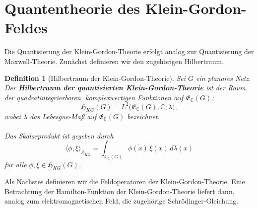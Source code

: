 \documentclass[11pt,a4paper,leqno]{report}
\newtheorem{definition}[theorem]{Definition}
\numberwithin{equation}{chapter}
\begin{document}
\section{Quantentheorie des Klein-Gordon-Feldes}
Die Quantisierung der Klein-Gordon-Theorie erfolgt analog zur Quantisierung
der Maxwell-Theorie. Zunächst definieren wir den zugehörigen Hilbertraum.

\begin{definition}[Hilbertraum der Klein-Gordon-Theorie]
	\label{def:KG-Hilbertraum}
	Sei $G$ ein planares Netz. Der \textbf{Hilbertraum der quantisierten
		Klein-Gordon-Theorie} ist der Raum der quadratintegrierbaren, komplexwertigen
	Funktionen auf $\mathfrak{E}_{\mathbb C}(G)$:
	\[
	\mathfrak H_{KG}(G)
	=
	L^2\bigl(\mathfrak E_{\mathbb C}(G),\mathbb C;\lambda\bigr),
	\]
	wobei $\lambda$ das Lebesgue-Maß auf $\mathfrak E_{\mathbb C}(G)$ bezeichnet.
	\\
	\\
	Das Skalarprodukt ist gegeben durch
	\begin{equation}
		\label{eq:KG-Hilbertraum-Skalarprodukt}
		\langle \phi,\xi\rangle_{\mathfrak H_{KG}}
		=
		\int_{\mathfrak E_{\mathbb C}(G)}
		\overline{\phi(x)}\,\xi(x)\,d\lambda(x)
	\end{equation}
	für alle $\phi,\xi\in\mathfrak H_{KG}(G)$.
\end{definition}
\noindent
Als Nächstes definieren wir die Feldoperatoren der Klein-Gordon-Theorie. 
Eine Betrachtung der Hamilton-Funktion der Klein-Gordon-Theorie liefert dann, 
analog zum elektromagnetischen Feld, die zugehörige Schrödinger-Gleichung.
\end{document}
